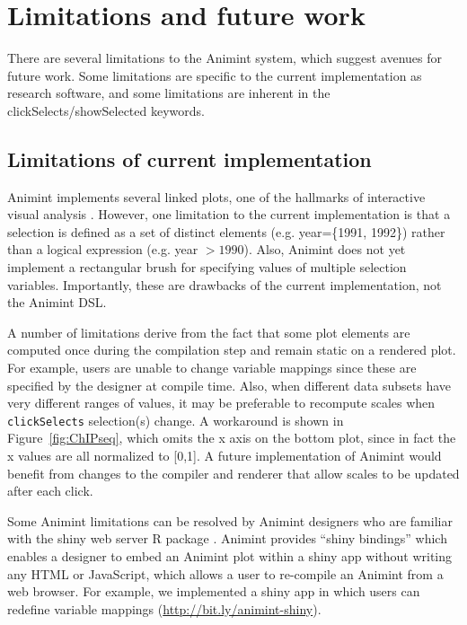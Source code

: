\documentclass[10pt,journal,compsoc]{IEEEtran}\usepackage[]{graphicx}\usepackage[]{color}
\begin{document}
\section{Limitations and future work}

There are several limitations to the Animint system, which suggest
avenues for future work. Some limitations are specific to the current
implementation as research software, and some limitations are inherent
in the clickSelects/showSelected keywords.

\subsection{Limitations of current implementation}

Animint implements several linked plots, one of the hallmarks of
interactive visual analysis \citep{iva}. However, one limitation to
the current implementation is that a selection is defined as a set of
distinct elements (e.g. year=\{1991, 1992\}) rather than a logical
expression (e.g. year $>1990$). Also, Animint does not yet
implement a rectangular brush for specifying values of
multiple selection variables.
Importantly, these are drawbacks of the
current implementation, not the Animint DSL.

A number of limitations derive from the fact that some plot elements
are computed once during the compilation step and remain static on a
rendered plot. For example, users are unable to change variable
mappings since these are specified by the designer at compile
time. Also, when different data subsets have very different ranges of
values, it may be preferable to recompute scales when
\texttt{clickSelects} selection(s) change. A workaround is shown in
Figure~\ref{fig:ChIPseq}, which omits the x axis on the bottom plot,
since in fact the x values are all normalized to [0,1]. A future
implementation of Animint would benefit from changes to the compiler
and renderer that allow scales to be updated after each click.

Some Animint limitations can be resolved by Animint designers who are
familiar with the shiny web server R package \citep{shiny}.  Animint
provides ``shiny bindings'' which enables a designer to embed an
Animint plot within a shiny app without writing any HTML or
JavaScript, which allows a user to re-compile an Animint from a web
browser. For example, we implemented a shiny app in which users can
redefine variable mappings (\url{http://bit.ly/animint-shiny}).
\end{document}
